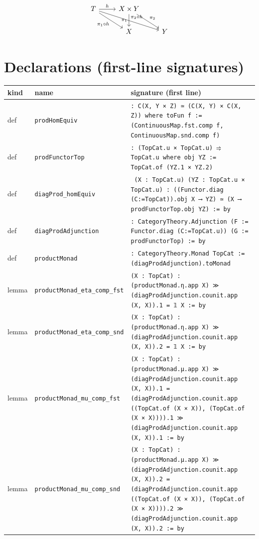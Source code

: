 \documentclass[12pt]{article}
\begin{document}
\[
\begin{tikzcd}
T \arrow[r, "h"] \arrow[dr, swap, "\pi_1\circ h"] \arrow[drr, "\pi_2\circ h"] & X\times Y \arrow[d, swap, "\pi_1"] \arrow[dr, "\pi_2"] \\
& X & Y
\end{tikzcd}
\]


\section*{Declarations (first-line signatures)} 
\begin{center}
\begin{tabular}{lll}
\textbf{kind} & \textbf{name} & \textbf{signature (first line)} \\ \hline
def & \texttt{prodHomEquiv} & \texttt{: C(X, Y × Z) ≃ (C(X, Y) × C(X, Z)) where toFun f := (ContinuousMap.fst.comp f, ContinuousMap.snd.comp f)} \\
def & \texttt{prodFunctorTop} & \texttt{: (TopCat.{u} × TopCat.{u}) ⥤ TopCat.{u} where obj YZ := TopCat.of (YZ.1 × YZ.2)} \\
def & \texttt{diagProd\_homEquiv} & \texttt{ (X : TopCat.{u}) (YZ : TopCat.{u} × TopCat.{u}) : ((Functor.diag (C:=TopCat)).obj X ⟶ YZ) ≃ (X ⟶ prodFunctorTop.obj YZ) := by} \\
def & \texttt{diagProdAdjunction} & \texttt{: CategoryTheory.Adjunction (F := Functor.diag (C:=TopCat.{u})) (G := prodFunctorTop) := by} \\
def & \texttt{productMonad} & \texttt{: CategoryTheory.Monad TopCat := (diagProdAdjunction).toMonad} \\
lemma & \texttt{productMonad\_eta\_comp\_fst} & \texttt{(X : TopCat) : (productMonad.η.app X) ≫ (diagProdAdjunction.counit.app (X, X)).1 = 𝟙 X := by} \\
lemma & \texttt{productMonad\_eta\_comp\_snd} & \texttt{(X : TopCat) : (productMonad.η.app X) ≫ (diagProdAdjunction.counit.app (X, X)).2 = 𝟙 X := by} \\
lemma & \texttt{productMonad\_mu\_comp\_fst} & \texttt{(X : TopCat) : (productMonad.μ.app X) ≫ (diagProdAdjunction.counit.app (X, X)).1 = (diagProdAdjunction.counit.app ((TopCat.of (X × X)), (TopCat.of (X × X)))).1 ≫ (diagProdAdjunction.counit.app (X, X)).1 := by} \\
lemma & \texttt{productMonad\_mu\_comp\_snd} & \texttt{(X : TopCat) : (productMonad.μ.app X) ≫ (diagProdAdjunction.counit.app (X, X)).2 = (diagProdAdjunction.counit.app ((TopCat.of (X × X)), (TopCat.of (X × X)))).2 ≫ (diagProdAdjunction.counit.app (X, X)).2 := by} \\

\end{tabular}
\end{center}
\end{document}
